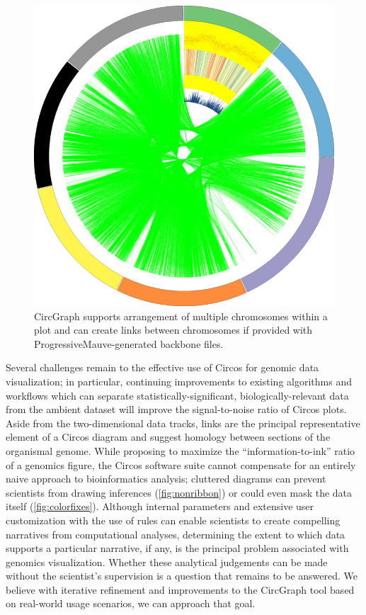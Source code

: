 \documentclass[twocolumn]{article}
\newcommand{\projectName}{CircGraph\xspace}
\begin{document}
\begin{figure}
\centering
\includegraphics[scale=0.3]{./images/thumbs/links.png}
\caption{\projectName supports arrangement of multiple chromosomes within a plot and can create links between chromosomes if provided with ProgressiveMauve-generated backbone files.\label{fig:links}}
\end{figure}

Several challenges remain to the effective use of Circos for genomic data visualization; in particular, continuing improvements to existing algorithms and workflows which can separate statistically-significant, biologically-relevant data from the ambient dataset will improve the signal-to-noise ratio of Circos plots. Aside from the two-dimensional data tracks, links are the principal representative element of a Circos diagram and suggest homology between sections of the organismal genome. While proposing to maximize the ``information-to-ink''\cite{tufte} ratio of a genomics figure, the Circos software suite cannot compensate for an entirely naive approach to bioinformatics analysis; cluttered diagrams can prevent scientists from drawing inferences (\cref{fig:nonribbon}) or could even mask the data itself (\cref{fig:colorfixes}).\cite{circospaper} Although internal parameters and extensive user customization with the use of rules can enable scientists to create compelling narratives from computational analyses, determining the extent to which data supports a particular narrative, if any, is the principal problem associated with genomics visualization. Whether these analytical judgements can be made without the scientist's supervision is a question that remains to be answered. We believe with iterative refinement and improvements to the \projectName tool based on real-world usage scenarios, we can approach that goal.
\end{document}
